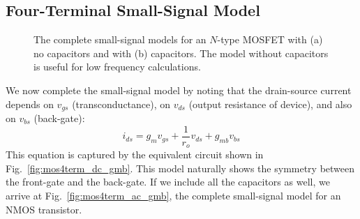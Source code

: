 \subsection{Four-Terminal Small-Signal Model}
\begin{figure}[tb]
\centering
{}
\caption{The complete small-signal models for an $N$-type MOSFET with (a) no capacitors and with (b) capacitors.  The model without capacitors is useful for low frequency calculations.} 
\end{figure}
We now complete the small-signal model by noting that the drain-source current depends on $v_{gs}$ (transconductance), on $v_{ds}$ (output resistance of device), and also on $v_{bs}$ (back-gate):
    \begin{equation}
        {i_{ds}} = {g_m}{v_{gs}} + \frac{1}{{{r_o}}}{v_{ds}} + {g_{mb}}{v_{bs}} 
    \end{equation}
This equation is captured by the equivalent circuit shown in Fig.~\ref{fig:mos4term_dc_gmb}.  This model naturally shows the symmetry between the front-gate and the back-gate.  If we include all the capacitors as well, we arrive at Fig.~\ref{fig:mos4term_ac_gmb}, the complete small-signal model for an NMOS transistor.
